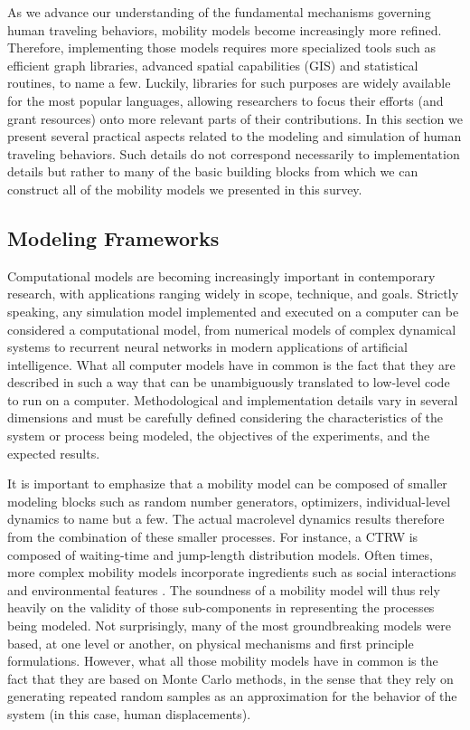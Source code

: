 As we advance our understanding of the fundamental mechanisms governing human traveling behaviors, mobility models become increasingly more refined. Therefore, implementing those models requires more specialized tools such as efficient graph libraries, advanced spatial capabilities (GIS) and statistical routines, to name a few. Luckily, libraries for such purposes are widely available for the most popular languages, allowing researchers to focus their efforts (and grant resources) onto more relevant parts of their contributions.
In this section we present several practical aspects related to the modeling and simulation of human traveling behaviors. Such details do not correspond necessarily to implementation details but rather to many of the basic building blocks from which we can construct all of the mobility models we presented in this survey.  


\subsection{Modeling Frameworks}
\label{sec:frameworks}

Computational models are becoming increasingly important in contemporary research, with applications ranging widely in scope, technique, and goals. Strictly speaking, any simulation model implemented and executed on a computer can be considered a computational model, from numerical models of complex dynamical systems to recurrent neural networks in modern applications of artificial intelligence. 
What all computer models have in common is the fact that they are described in such a way that can be unambiguously translated to low-level code to run on a computer. Methodological and implementation details vary in several dimensions and must be carefully defined considering the characteristics of the system or process being modeled, the objectives of the experiments, and the expected results.

It is important to emphasize that a mobility model can be composed of smaller modeling blocks such as random number generators, optimizers, individual-level dynamics to name but a few. The actual macrolevel dynamics results therefore from the combination of these smaller processes. For instance, a CTRW is composed of waiting-time and jump-length distribution models. Often times, more complex mobility models incorporate ingredients such as social interactions \cite{grabowicz_2014_entangling,toole_2015_coupling} and environmental features \cite{eash_1984_development,erlander_1990_gravity,goncalves_1993_development,simini_2012_universal}. The soundness of a mobility model will thus rely heavily on the validity of those sub-components in representing the processes being modeled. Not surprisingly, many of the most groundbreaking models were based, at one level or another, on physical mechanisms and first principle formulations.
However, what all those mobility models have in common is the fact that they are based on Monte Carlo methods, in the sense that they rely on generating repeated random samples as an approximation for the behavior of the system (in this case, human displacements). 

